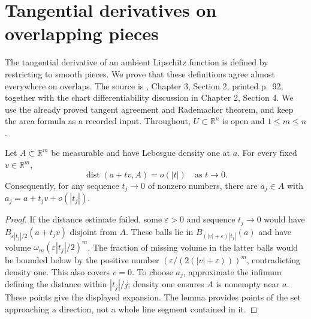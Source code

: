 \chapter{Tangential derivatives on overlapping pieces}\label{sec:tangential-differential-independence}
The tangential derivative of an ambient Lipschitz function is defined by restricting to smooth pieces. We prove that these definitions agree almost everywhere on overlaps. The source is \cite{Sim18}, Chapter 3, Section 2, printed p.~92, together with the chart differentiability discussion in Chapter 2, Section 4. We use the already proved tangent agreement and Rademacher theorem, and keep the area formula as a recorded input. Throughout, $U\subset\mathbb R^n$ is open and $1\leq m\leq n$.

\begin{lemma}\label{lem:density-one-direction-approximation}
Let $A\subset\mathbb R^m$ be measurable and have Lebesgue density one at $a$. For every fixed $v\in\mathbb R^m$,
\[
 \operatorname{dist}(a+tv,A)=o(|t|)\quad\text{as }t\to0.
\]
Consequently, for any sequence $t_j\to0$ of nonzero numbers, there are $a_j\in A$ with $a_j=a+t_jv+o(|t_j|)$.
\end{lemma}
\begin{proof}
If the distance estimate failed, some $\varepsilon>0$ and sequence $t_j\to0$ would have $B_{\varepsilon|t_j|/2}(a+t_jv)$ disjoint from $A$. These balls lie in $B_{(|v|+\varepsilon)|t_j|}(a)$ and have volume $\omega_m(\varepsilon|t_j|/2)^m$. The fraction of missing volume in the latter balls would be bounded below by the positive number $(\varepsilon/(2(|v|+\varepsilon)))^m$, contradicting density one. This also covers $v=0$. To choose $a_j$, approximate the infimum defining the distance within $|t_j|/j$; density one ensures $A$ is nonempty near $a$. These points give the displayed expansion. The lemma provides points of the set approaching a direction, not a whole line segment contained in it.
\end{proof}

